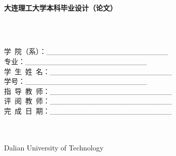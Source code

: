 	\begin{titlepage}
		\begin{center}
			~\\[8pt]
			 {\songti\textbf{大连理工大学本科毕业设计（论文）}}
			~\\[35pt]
			\textbf{}
			~\\[15pt]
		\end{center}
		\textbf{}
		\begin{center}
			~\\[120pt]
			\begin{spacing}{1.7}
				 {\songti 学\ 院（系）：\_\_\_\_\_\_\_\_\_\_\_\_\_\_\_\_\_\_\_\_\_\_\_}\\
				 {\songti 专\qquad \quad  业：\_\_\_\_\_\_\_\_\_\_\_\_\_\_\_\_\_\_\_\_\_\_\_}\\
				 {\songti 学\ 生\ 姓\ 名：\_\_\_\_\_\_\_\_\_\_\_\_\_\_\_\_\_\_\_\_\_\_\_}\\
				 {\songti 学\qquad \quad 号：\_\_\_\_\_\_\_\_\_\_\_\_\_\_\_\_\_\_\_\_\_\_\_}\\
				 {\songti 指\ 导\ 教\ 师：\_\_\_\_\_\_\_\_\_\_\_\_\_\_\_\_\_\_\_\_\_\_\_}\\
				 {\songti 评\ 阅\ 教\ 师：\_\_\_\_\_\_\_\_\_\_\_\_\_\_\_\_\_\_\_\_\_\_\_}\\
				 {\songti 完\ 成\ 日\ 期：\_\_\_\_\_\_\_\_\_\_\_\_\_\_\_\_\_\_\_\_\_\_\_}\\
			\end{spacing}
			~\\[70pt]
			{ }\\
			{ Dalian University of Technology}
		\end{center}
	\newpage
	\end{titlepage}
	
